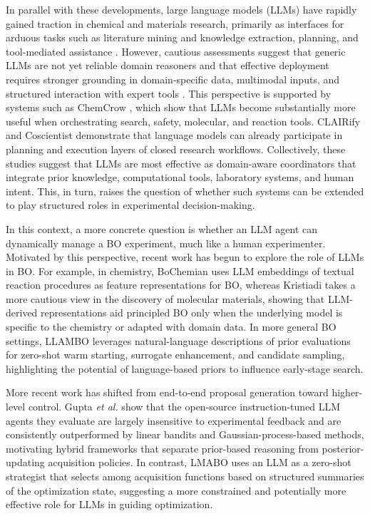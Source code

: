In parallel with these developments, large language models (LLMs) have rapidly gained traction in chemical and materials research, primarily as interfaces for arduous tasks such as literature mining and knowledge extraction, planning, and tool-mediated assistance \cite{lei2024materials,jablonka202314,ramos2025review, jiang2025applications,dagdelen2024structured,katzer2025towards}. However, cautious assessments suggest that generic LLMs are not yet reliable domain reasoners and that effective deployment requires stronger grounding in domain-specific data, multimodal inputs, and structured interaction with expert tools \cite{miret2025enabling}. This perspective is supported by systems such as ChemCrow \cite{m2024augmenting}, which show that LLMs become substantially more useful when orchestrating search, safety, molecular, and reaction tools. CLAIRify \cite{yoshikawa2023large} and Coscientist \cite{boiko2023autonomous} demonstrate that language models can already participate in planning and execution layers of closed research workflows. Collectively, these studies suggest that LLMs are most effective as domain-aware coordinators that integrate prior knowledge, computational tools, laboratory systems, and human intent. This, in turn, raises the question of whether such systems can be extended to play structured roles in experimental decision-making.

In this context, a more concrete question is whether an LLM agent can dynamically manage a BO experiment, much like a human experimenter. Motivated by this perspective, recent work has begun to explore the role of LLMs in BO. For example, in chemistry, BoChemian \cite{rankovic2023bochemian} uses LLM embeddings of textual reaction procedures as feature representations for BO, whereas Kristiadi \etal \cite{kristiadi2024sober} takes a more cautious view in the discovery of molecular materials, showing that LLM-derived representations aid principled BO only when the underlying model is specific to the chemistry or adapted with domain data. In more general BO settings, LLAMBO \cite{liu2024large} leverages natural-language descriptions of prior evaluations for zero-shot warm starting, surrogate enhancement, and candidate sampling, highlighting the potential of language-based priors to influence early-stage search. 

More recent work has shifted from end-to-end proposal generation toward higher-level control. Gupta \emph{et al.} \cite{gupta2025llms} show that the open-source instruction-tuned LLM agents they evaluate are largely insensitive to experimental feedback and are consistently outperformed by linear bandits and Gaussian-process-based methods, motivating hybrid frameworks that separate prior-based reasoning from posterior-updating acquisition policies. In contrast, LMABO \cite{ngo2026adaptive} uses an LLM as a zero-shot strategist that selects among acquisition functions based on structured summaries of the optimization state, suggesting a more constrained and potentially more effective role for LLMs in guiding optimization. 

